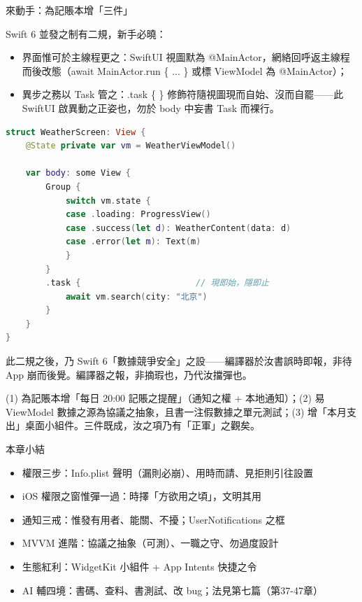 \begin{tcbpractice}{來動手：為記賬本增「三件」}

Swift 6 並發之制有二規，新手必曉：

\begin{itemize}
  \item 界面惟可於主線程更之：SwiftUI 視圖默為 @MainActor，網絡回呼返主線程而後改態（await MainActor.run \{ ... \} 或標 ViewModel 為 @MainActor）；
  \item 異步之務以 Task 管之：.task \{ \} 修飾符隨視圖現而自始、沒而自罷——此 SwiftUI 啟異動之正姿也，勿於 body 中妄書 Task 而裸行。
\end{itemize}

\begin{lstlisting}[language=Swift]
struct WeatherScreen: View {
    @State private var vm = WeatherViewModel()

    var body: some View {
        Group {
            switch vm.state {
            case .loading: ProgressView()
            case .success(let d): WeatherContent(data: d)
            case .error(let m): Text(m)
            }
        }
        .task {                       // 現即始，隱即止
            await vm.search(city: "北京")
        }
    }
}
\end{lstlisting}

此二規之後，乃 Swift 6「數據競爭安全」之設——編譯器於汝書誤時即報，非待 App 崩而後覺。編譯器之報，非摘瑕也，乃代汝擋彈也。

(1) 為記賬本增「每日 20:00 記賬之提醒」（通知之權 + 本地通知）；(2) 易 ViewModel 數據之源為協議之抽象，且書一注假數據之單元測試；(3) 增「本月支出」桌面小組件。三件既成，汝之項乃有「正軍」之觀矣。

\end{tcbpractice}

\begin{tcbsummary}{本章小結}
\begin{itemize}
  \item 權限三步：Info.plist 聲明（漏則必崩）、用時而請、見拒則引往設置
  \item iOS 權限之窗惟彈一過：時擇「方欲用之頃」，文明其用
  \item 通知三戒：惟發有用者、能關、不擾；UserNotifications 之框
  \item MVVM 進階：協議之抽象（可測）、一職之守、勿過度設計
  \item 生態紅利：WidgetKit 小組件 + App Intents 快捷之令
  \item AI 輔四境：書碼、查料、書測試、改 bug；法見第七篇（第37-47章）
\end{itemize}

\end{tcbsummary}
